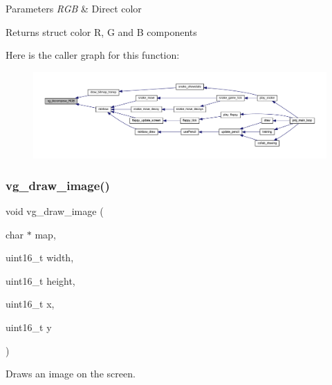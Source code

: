 \begin{DoxyParams}{Parameters}
{\em R\+GB} & Direct color \\
\hline
\end{DoxyParams}
\begin{DoxyReturn}{Returns}
struct color R, G and B components 
\end{DoxyReturn}
Here is the caller graph for this function\+:\nopagebreak
\begin{figure}[H]
\begin{center}
\leavevmode
\includegraphics[width=350pt]{group__video_ga9fcd5199ebdc148ef21c1faea7280d3f_icgraph}
\end{center}
\end{figure}
\mbox{\label{group__video_ga1362f68261a0b7dcb4d00ca0a3ebb238}} 
\subsubsection{\texorpdfstring{vg\+\_\+draw\+\_\+image()}{vg\_draw\_image()}}
{\footnotesize\ttfamily void vg\+\_\+draw\+\_\+image (\begin{DoxyParamCaption}\item[{char $\ast$}]{map,  }\item[{uint16\+\_\+t}]{width,  }\item[{uint16\+\_\+t}]{height,  }\item[{uint16\+\_\+t}]{x,  }\item[{uint16\+\_\+t}]{y }\end{DoxyParamCaption})}



Draws an image on the screen. 



